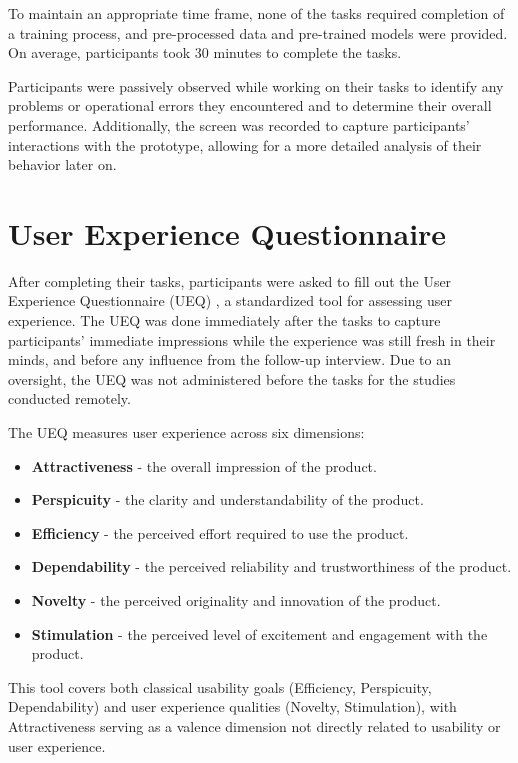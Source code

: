 To maintain an appropriate time frame, none of the tasks required completion of a training process, and pre-processed data and pre-trained models were provided.
On average, participants took 30 minutes to complete the tasks.

Participants were passively observed while working on their tasks to identify any problems or operational errors they encountered and to determine their overall performance.
Additionally, the screen was recorded to capture participants' interactions with the prototype, allowing for a more detailed analysis of their behavior later on.

\section{User Experience Questionnaire}
\label{sec:study:ueq}

After completing their tasks, participants were asked to fill out the User Experience Questionnaire (UEQ) \cite{laugwitz_construction_2008}, a standardized tool for assessing user experience.
The UEQ was done immediately after the tasks to capture participants' immediate impressions while the experience was still fresh in their minds, and before any influence from the follow-up interview.
Due to an oversight, the UEQ was not administered before the tasks for the studies conducted remotely.

The UEQ measures user experience across six dimensions:

\begin{itemize}
  \item \textbf{Attractiveness} - the overall impression of the product.
  \item \textbf{Perspicuity} - the clarity and understandability of the product.
  \item \textbf{Efficiency} - the perceived effort required to use the product.
  \item \textbf{Dependability} - the perceived reliability and trustworthiness of the product.
  \item \textbf{Novelty} - the perceived originality and innovation of the product.
  \item \textbf{Stimulation} - the perceived level of excitement and engagement with the product.
\end{itemize}

This tool covers both classical usability goals (Efficiency, Perspicuity, Dependability) and user experience qualities (Novelty, Stimulation), with Attractiveness serving as a valence dimension not directly related to usability or user experience.

